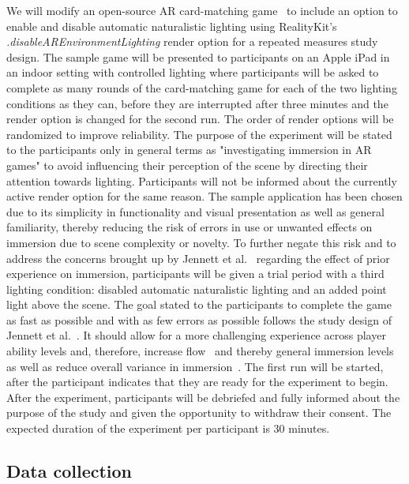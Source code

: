 \documentclass[12pt,twoside,english]{article}
\begin{document}
We will modify an open-source \gls{AR} card-matching game~\cite{cobb_maxxfrazerrealitykit-cardflip_2020} to include an option to enable and disable automatic naturalistic lighting using RealityKit's \textit{.disableAREnvironmentLighting} render option for a repeated measures study design.
The sample game will be presented to participants on an Apple iPad in an indoor setting with controlled lighting where participants will be asked to complete as many rounds of the card-matching game for each of the two lighting conditions as they can, before they are interrupted after three minutes and the render option is changed for the second run.
The order of render options will be randomized to improve reliability.
The purpose of the experiment will be stated to the participants only in general terms as "investigating immersion in \gls{AR} games" to avoid influencing their perception of the scene by directing their attention towards lighting.
Participants will not be informed about the currently active render option for the same reason.
The sample application has been chosen due to its simplicity in functionality and visual presentation as well as general familiarity, thereby reducing the risk of errors in use or unwanted effects on immersion due to scene complexity or novelty.
To further negate this risk and to address the concerns brought up by Jennett et al.~\cite{jennett_measuring_2008} regarding the effect of prior experience on immersion, participants will be given a trial period with a third lighting condition: disabled automatic naturalistic lighting and an added point light above the scene.
The goal stated to the participants to complete the game as fast as possible and with as few errors as possible follows the study design of Jennett et al.~\cite{jennett_measuring_2008}.
It should allow for a more challenging experience across player ability levels and, therefore, increase flow~\cite{csikszentmihalyi_flow_1990} and thereby general immersion levels as well as reduce overall variance in immersion~\cite{jennett_measuring_2008}.
The first run will be started, after the participant indicates that they are ready for the experiment to begin.
After the experiment, participants will be debriefed and fully informed about the purpose of the study and given the opportunity to withdraw their consent.
The expected duration of the experiment per participant is 30 minutes.

\subsection{Data collection}
\label{sect:data_collection}
\end{document}
